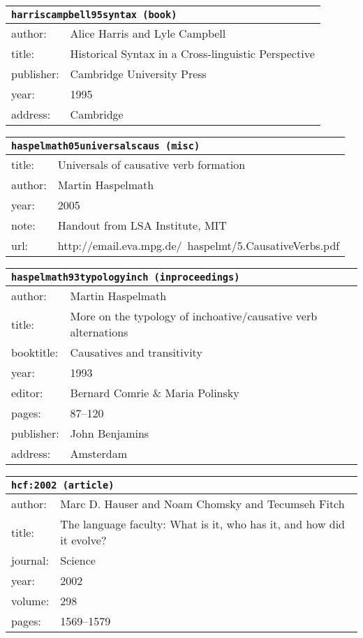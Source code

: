 \documentclass{article}
\begin{document}
\begin{tabular}{p{}p{}}
\multicolumn{2}{l}{\texttt{harriscampbell95syntax (book)}}\\
\hline
author: & Alice Harris and Lyle Campbell\\
title: &  Historical Syntax in a Cross-linguistic Perspective\\
publisher: & Cambridge University Press\\
year: & 1995\\
address: & Cambridge\\
\end{tabular}

\bigskip

\begin{tabular}{p{}p{}}
\multicolumn{2}{l}{\texttt{haspelmath05universalscaus (misc)}}\\
\hline
title: & Universals of causative verb formation\\
author: & Martin Haspelmath\\
year: & 2005\\
note: & Handout from LSA Institute, MIT\\
url: & http://email.eva.mpg.de/~haspelmt/5.CausativeVerbs.pdf\\
\end{tabular}

\bigskip

\begin{tabular}{p{}p{}}
\multicolumn{2}{l}{\texttt{haspelmath93typologyinch (inproceedings)}}\\
\hline
author: & Martin Haspelmath\\
title: & More on the typology of inchoative/causative verb alternations\\
booktitle: & Causatives and transitivity\\
year: & 1993\\
editor: & Bernard Comrie \& Maria Polinsky\\
pages: & 87--120\\
publisher: & John Benjamins\\
address: & Amsterdam\\
\end{tabular}

\bigskip

\begin{tabular}{p{}p{}}
\multicolumn{2}{l}{\texttt{hcf:2002 (article)}}\\
\hline
author: & Marc D. Hauser and Noam Chomsky and Tecumseh Fitch\\
title: & The language faculty: What is it, who has it, and how did it evolve?\\
journal: & Science\\
year: & 2002\\
volume: & 298\\
pages: & 1569--1579\\
\end{tabular}
\end{document}
